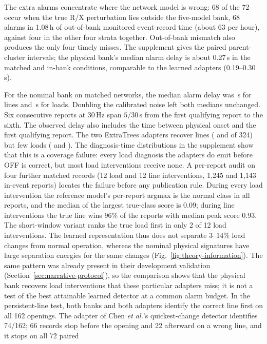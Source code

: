 The extra alarms concentrate where the network model is wrong: 68 of the
72 occur when the true R/X perturbation lies outside the five-model bank,
68 alarms in 1.08\,h of out-of-bank monitored event-record time (about 63
per hour), against four in the other four strata together. Out-of-bank mismatch also produces the only
four timely misses. The supplement gives the paired parent-cluster
intervals; the physical bank's median alarm delay is about 0.27\,s in the
matched and in-bank conditions, comparable to the learned adapters
(0.19--0.30\,s).

For the nominal bank on matched networks, the median alarm delay was
\RevObsLineDelay\,s for lines and \RevObsLoadDelay\,s for loads. Doubling
the calibrated noise left both medians unchanged. Six consecutive reports
at 30\,Hz span $5/30$\,s from the first qualifying report to the sixth.
The observed delay also includes the time between physical onset and the
first qualifying report.
The two ExtraTrees adapters recover lines (\ReaderETLine{} and
\ReaderETShortLine{} of 324) but few loads (\ReaderETLoad{} and
\ReaderETShortLoad{}). The diagnosis-time distributions in the supplement show that this is a
coverage failure: every load diagnosis the adapters do emit before OFF is
correct, but most load interventions receive none. A per-report audit on
four further matched records (12 load and 12 line interventions,
1{,}245 and 1{,}143 in-event reports) locates the failure before any
publication rule. During every load intervention the reference model's
per-report argmax is the normal class in all reports, and the median of
the largest true-class score is 0.09; during line interventions the true
line wins 96\% of the reports with median peak score 0.93. The short-window
variant ranks the true load first in only 2 of 12 load interventions. The
learned representation thus does not separate 3--14\% load changes from
normal operation, whereas the nominal physical signatures have large separation energies
for the same changes (Fig.~\ref{fig:theory-information}). The same pattern was already present in
their development validation (Section~\ref{sec:narrative-protocol}), so the
comparison shows that the physical bank recovers load interventions that
these particular adapters miss; it is not a test of the best attainable
learned detector at a common alarm budget.
In the persistent-line test, both banks and both adapters identify the
correct line first on all 162 openings. The adapter of Chen \emph{et al.}'s
quickest-change detector identifies 74/162; 66 records stop before the
opening and 22 afterward on a wrong line, and it stops on all 72 paired
